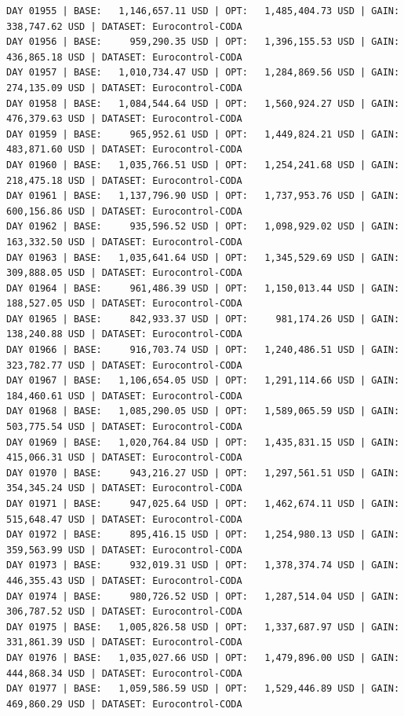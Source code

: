 \documentclass[11pt,a4paper]{article}
\begin{document}
\begin{verbatim}
DAY 01955 | BASE:   1,146,657.11 USD | OPT:   1,485,404.73 USD | GAIN: 338,747.62 USD | DATASET: Eurocontrol-CODA
DAY 01956 | BASE:     959,290.35 USD | OPT:   1,396,155.53 USD | GAIN: 436,865.18 USD | DATASET: Eurocontrol-CODA
DAY 01957 | BASE:   1,010,734.47 USD | OPT:   1,284,869.56 USD | GAIN: 274,135.09 USD | DATASET: Eurocontrol-CODA
DAY 01958 | BASE:   1,084,544.64 USD | OPT:   1,560,924.27 USD | GAIN: 476,379.63 USD | DATASET: Eurocontrol-CODA
DAY 01959 | BASE:     965,952.61 USD | OPT:   1,449,824.21 USD | GAIN: 483,871.60 USD | DATASET: Eurocontrol-CODA
DAY 01960 | BASE:   1,035,766.51 USD | OPT:   1,254,241.68 USD | GAIN: 218,475.18 USD | DATASET: Eurocontrol-CODA
DAY 01961 | BASE:   1,137,796.90 USD | OPT:   1,737,953.76 USD | GAIN: 600,156.86 USD | DATASET: Eurocontrol-CODA
DAY 01962 | BASE:     935,596.52 USD | OPT:   1,098,929.02 USD | GAIN: 163,332.50 USD | DATASET: Eurocontrol-CODA
DAY 01963 | BASE:   1,035,641.64 USD | OPT:   1,345,529.69 USD | GAIN: 309,888.05 USD | DATASET: Eurocontrol-CODA
DAY 01964 | BASE:     961,486.39 USD | OPT:   1,150,013.44 USD | GAIN: 188,527.05 USD | DATASET: Eurocontrol-CODA
DAY 01965 | BASE:     842,933.37 USD | OPT:     981,174.26 USD | GAIN: 138,240.88 USD | DATASET: Eurocontrol-CODA
DAY 01966 | BASE:     916,703.74 USD | OPT:   1,240,486.51 USD | GAIN: 323,782.77 USD | DATASET: Eurocontrol-CODA
DAY 01967 | BASE:   1,106,654.05 USD | OPT:   1,291,114.66 USD | GAIN: 184,460.61 USD | DATASET: Eurocontrol-CODA
DAY 01968 | BASE:   1,085,290.05 USD | OPT:   1,589,065.59 USD | GAIN: 503,775.54 USD | DATASET: Eurocontrol-CODA
DAY 01969 | BASE:   1,020,764.84 USD | OPT:   1,435,831.15 USD | GAIN: 415,066.31 USD | DATASET: Eurocontrol-CODA
DAY 01970 | BASE:     943,216.27 USD | OPT:   1,297,561.51 USD | GAIN: 354,345.24 USD | DATASET: Eurocontrol-CODA
DAY 01971 | BASE:     947,025.64 USD | OPT:   1,462,674.11 USD | GAIN: 515,648.47 USD | DATASET: Eurocontrol-CODA
DAY 01972 | BASE:     895,416.15 USD | OPT:   1,254,980.13 USD | GAIN: 359,563.99 USD | DATASET: Eurocontrol-CODA
DAY 01973 | BASE:     932,019.31 USD | OPT:   1,378,374.74 USD | GAIN: 446,355.43 USD | DATASET: Eurocontrol-CODA
DAY 01974 | BASE:     980,726.52 USD | OPT:   1,287,514.04 USD | GAIN: 306,787.52 USD | DATASET: Eurocontrol-CODA
DAY 01975 | BASE:   1,005,826.58 USD | OPT:   1,337,687.97 USD | GAIN: 331,861.39 USD | DATASET: Eurocontrol-CODA
DAY 01976 | BASE:   1,035,027.66 USD | OPT:   1,479,896.00 USD | GAIN: 444,868.34 USD | DATASET: Eurocontrol-CODA
DAY 01977 | BASE:   1,059,586.59 USD | OPT:   1,529,446.89 USD | GAIN: 469,860.29 USD | DATASET: Eurocontrol-CODA

\end{verbatim}
\end{document}
